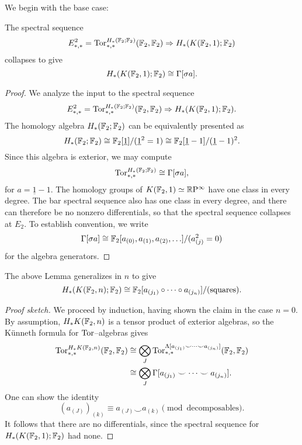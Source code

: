 We begin with the base case:
\begin{lemma}\label{UnstableSAlgBase}
The spectral sequence \[E_{*, *}^2 = \operatorname{Tor}^{H_*(\mathbb F_2; \mathbb F_2)}_{*, *}(\mathbb F_2, \mathbb F_2) \Rightarrow H_*(K(\mathbb F_2, 1); \mathbb F_2)\] collapses to give \[H_*(K(\mathbb F_2, 1); \mathbb F_2) \cong \Gamma[\sigma a].\]
\end{lemma}
\begin{proof}
We analyze the input to the spectral sequence \[E_{*, *}^2 = \operatorname{Tor}^{H_*(\mathbb F_2; \mathbb F_2)}_{*, *}(\mathbb F_2, \mathbb F_2) \Rightarrow H_*(K(\mathbb F_2, 1); \mathbb F_2).\]
The homology algebra $H_*(\mathbb F_2; \mathbb F_2)$ can be equivalently presented as \[H_*(\mathbb F_2; \mathbb F_2) \cong \mathbb F_2[\underline{1}] / (\underline 1^2 = 1) \cong \mathbb F_2[\underline 1 - 1] / (\underline 1 - 1)^2.\]
Since this algebra is exterior, we may compute \[\operatorname{Tor}^{H_*(\mathbb F_2; \mathbb F_2)}_{*, *} \cong \Gamma[\sigma a],\] for $a = \underline 1 - 1$.
The homology groups of $K(\mathbb F_2, 1) \simeq \mathbb R \mathrm{P}^\infty$ have one class in every degree.
The bar spectral sequence also has one class in every degree, and there can therefore be no nonzero differentials, so that the spectral sequence collapses at $E_2$.
To establish convention, we write \[\Gamma[\sigma a] \cong \mathbb F_2[a_{(0)}, a_{(1)}, a_{(2)}, \ldots] / (a_{(j)}^2 = 0)\] for the algebra generators.
\end{proof}

\begin{theorem}
The above Lemma generalizes in $n$ to give \[H_* (K(\mathbb F_2, n); \mathbb F_2) \cong \mathbb F_2[a_{(j_1)} \circ \cdots \circ a_{(j_n)}] / (\text{squares}).\]
\end{theorem}
\begin{proof}[Proof sketch]
We proceed by induction, having shown the claim in the case $n = 0$.
By assumption, $H_* K(\mathbb F_2, n)$ is a tensor product of exterior algebras, so the K\"unneth formula for $\operatorname{Tor}$--algebras gives
\begin{align*}
\operatorname{Tor}^{H_* K(\mathbb F_2, n)}_{*, *}(\mathbb F_2, \mathbb F_2) & \cong \bigotimes_J \operatorname{Tor}^{\Lambda[a_{(j_1)} \smile \cdots \smile a_{(j_n)}]}_{*, *}(\mathbb F_2, \mathbb F_2) \\
& \cong \bigotimes_J \Gamma[a_{(j_1)} \smile \cdots \smile a_{(j_n)}].
\end{align*}
One can show the identity  \[(a_{(J)})_{(k)} \equiv a_{(J)} \smile a_{(k)} \pmod{\text{decomposables}}.\]
It follows that there are no differentials, since the spectral sequence for $H_*(K(\mathbb F_2, 1); \mathbb F_2)$ had none.
\end{proof}

